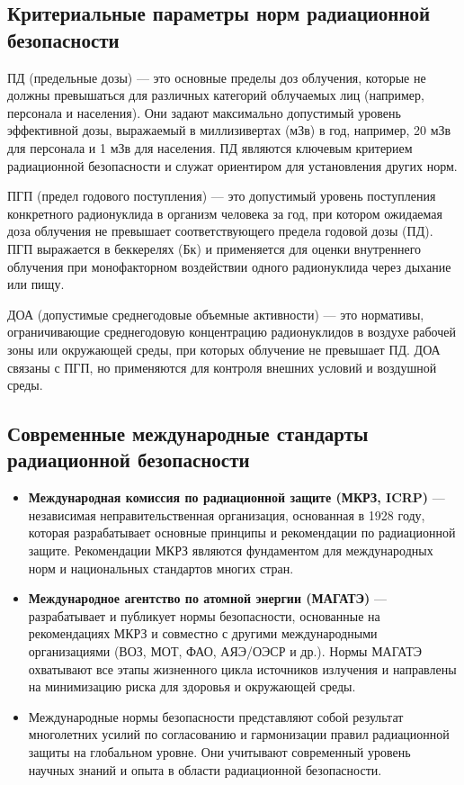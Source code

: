 \documentclass[a4paper, 14pt]{extarticle}
\begin{document}
\subsection{Критериальные параметры норм радиационной безопасности}

ПД (предельные дозы) — это основные пределы доз облучения, которые не должны превышаться для различных категорий облучаемых лиц (например, персонала и населения). Они задают максимально допустимый уровень эффективной дозы, выражаемый в миллизивертах (мЗв) в год, например, 20 мЗв для персонала и 1 мЗв для населения. ПД являются ключевым критерием радиационной безопасности и служат ориентиром для установления других норм.

ПГП (предел годового поступления) — это допустимый уровень поступления конкретного радионуклида в организм человека за год, при котором ожидаемая доза облучения не превышает соответствующего предела годовой дозы (ПД). ПГП выражается в беккерелях (Бк) и применяется для оценки внутреннего облучения при монофакторном воздействии одного радионуклида через дыхание или пищу.

ДОА (допустимые среднегодовые объемные активности) — это нормативы, ограничивающие среднегодовую концентрацию радионуклидов в воздухе рабочей зоны или окружающей среды, при которых облучение не превышает ПД. ДОА связаны с ПГП, но применяются для контроля внешних условий и воздушной среды.

\subsection{Современные международные стандарты радиационной безопасности}

\begin{itemize}
    \item \textbf{Международная комиссия по радиационной защите (МКРЗ, ICRP)} --- независимая неправительственная организация, основанная в 1928 году, которая разрабатывает основные принципы и рекомендации по радиационной защите. Рекомендации МКРЗ являются фундаментом для международных норм и национальных стандартов многих стран.
    \item \textbf{Международное агентство по атомной энергии (МАГАТЭ)} --- разрабатывает и публикует нормы безопасности, основанные на рекомендациях МКРЗ и совместно с другими международными организациями (ВОЗ, МОТ, ФАО, АЯЭ/ОЭСР и др.). Нормы МАГАТЭ охватывают все этапы жизненного цикла источников излучения и направлены на минимизацию риска для здоровья и окружающей среды.
    \item Международные нормы безопасности представляют собой результат многолетних усилий по согласованию и гармонизации правил радиационной защиты на глобальном уровне. Они учитывают современный уровень научных знаний и опыта в области радиационной безопасности.
\end{itemize}
\end{document}
